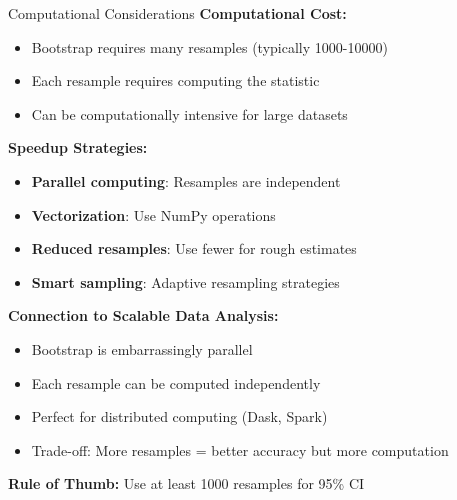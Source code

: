 \documentclass[aspectratio=169]{beamer}
\begin{document}
\begin{frame}{Computational Considerations}
\footnotesize
\textbf{Computational Cost:}
\begin{itemize}
    \item Bootstrap requires many resamples (typically 1000-10000)
    \item Each resample requires computing the statistic
    \item Can be computationally intensive for large datasets
\end{itemize}

\vspace{0.1cm}
\textbf{Speedup Strategies:}
\begin{itemize}
    \item \textbf{Parallel computing}: Resamples are independent
    \item \textbf{Vectorization}: Use NumPy operations
    \item \textbf{Reduced resamples}: Use fewer for rough estimates
    \item \textbf{Smart sampling}: Adaptive resampling strategies
\end{itemize}

\vspace{0.1cm}
\textbf{Connection to Scalable Data Analysis:}
\begin{itemize}
    \item Bootstrap is embarrassingly parallel
    \item Each resample can be computed independently
    \item Perfect for distributed computing (Dask, Spark)
    \item Trade-off: More resamples = better accuracy but more computation
\end{itemize}

\vspace{0.05cm}
\textbf{Rule of Thumb:} Use at least 1000 resamples for 95\% CI
\end{frame}
\end{document}
